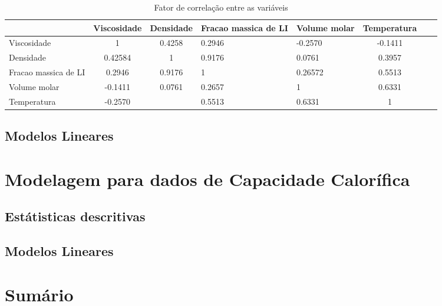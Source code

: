\documentclass[a4paper,12pt]{article}
\begin{document}
\begin{table}[htp]\centering
\begin{tabular}{p{2.8cm}|c|c|p{2.5cm}|p{2.5cm}|c|c|c|}
 \hline
 &  Viscosidade & Densidade  & Fracao massica de LI & Volume  molar &  Temperatura \\ \hline   
Viscosidade  & 1 & 0.4258 & 0.2946 & -0.2570 &  -0.1411  \\ \hline                                                                                                                                                    
Densidade  &0.42584 &  1&0.9176  & 0.0761 & 0.3957   \\ \hline      
Fracao massica de LI &  0.2946 & 0.9176  & 1  &0.26572  &0.5513 \\ \hline      
Volume  molar & -0.1411  & 0.0761 &0.2657  & 1  &0.6331  \\ \hline      
Temperatura & -0.2570 &  & 0.5513  & 0.6331 & 1  \\ \hline      

\end{tabular}
\caption{Fator de correlação entre as variáveis}
\end{table}



% 

\subsection{Modelos Lineares}

\section{Modelagem para dados de Capacidade Calorífica}

\subsection{Estátisticas descritivas}
\subsection{Modelos Lineares}

\section{Sumário}

\indent
\end{document}
